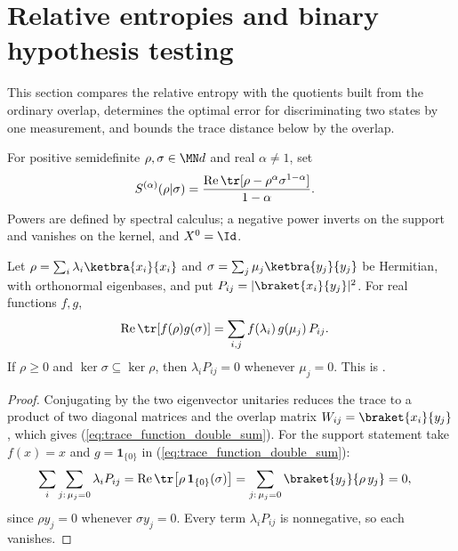 \section{Relative entropies and binary hypothesis testing}
\label{sec:hypothesis_testing}

This section compares the relative entropy with the quotients built from the
ordinary overlap, determines the optimal error for discriminating two states
by one measurement, and bounds the trace distance below by the overlap.

\begin{definition}
    \label{def:tsallis_relative_entropy}
    \leanok
    For positive semidefinite $\rho,\sigma\in\MN d$ and real $\alpha\ne1$, set
    \begin{align}
        S^{(\alpha)}(\rho|\sigma)
            &=\frac{\operatorname{Re}\tr[\rho-\rho^\alpha\sigma^{1-\alpha}]}{1-\alpha}.
        \label{eq:tsallis_relative_entropy}
    \end{align}
    Powers are defined by spectral calculus; a negative power inverts on the
    support and vanishes on the kernel, and $X^0=\Id$.
\end{definition}

\begin{lemma}
    \label{lem:trace_function_double_sum}
    \leanok
    Let $\rho=\sum_i\lambda_i\ketbra{x_i}{x_i}$ and
    $\sigma=\sum_j\mu_j\ketbra{y_j}{y_j}$ be Hermitian, with orthonormal
    eigenbases, and put $P_{ij}=\lvert\braket{x_i}{y_j}\rvert^2$. For real
    functions $f,g$,
    \begin{align}
        \operatorname{Re}\tr[f(\rho)g(\sigma)]
            &=\sum_{i,j}f(\lambda_i)\,g(\mu_j)\,P_{ij}.
        \label{eq:trace_function_double_sum}
    \end{align}
    If $\rho\ge0$ and $\ker\sigma\subseteq\ker\rho$, then $\lambda_iP_{ij}=0$
    whenever $\mu_j=0$.
    This is \cite[Equations~(8.36)--(8.37)]{Wolf2012Quantum}.
\end{lemma}
\begin{proof}
    \leanok
    Conjugating by the two eigenvector unitaries reduces the trace to a
    product of two diagonal matrices and the overlap matrix
    $W_{ij}=\braket{x_i}{y_j}$, which gives
    (\ref{eq:trace_function_double_sum}). For the support statement take
    $f(x)=x$ and $g=\mathbf 1_{\{0\}}$ in
    (\ref{eq:trace_function_double_sum}):
    \begin{align}
        \sum_{i}\sum_{j:\,\mu_j=0}\lambda_iP_{ij}
            &=\operatorname{Re}\tr\bigl[\rho\,\mathbf 1_{\{0\}}(\sigma)\bigr]
             =\sum_{j:\,\mu_j=0}\braket{y_j}{\rho\,y_j}=0,
        \label{eq:trace_function_kernel_weight}
    \end{align}
    since $\rho y_j=0$ whenever $\sigma y_j=0$. Every term $\lambda_iP_{ij}$ is
    nonnegative, so each vanishes.
\end{proof}

